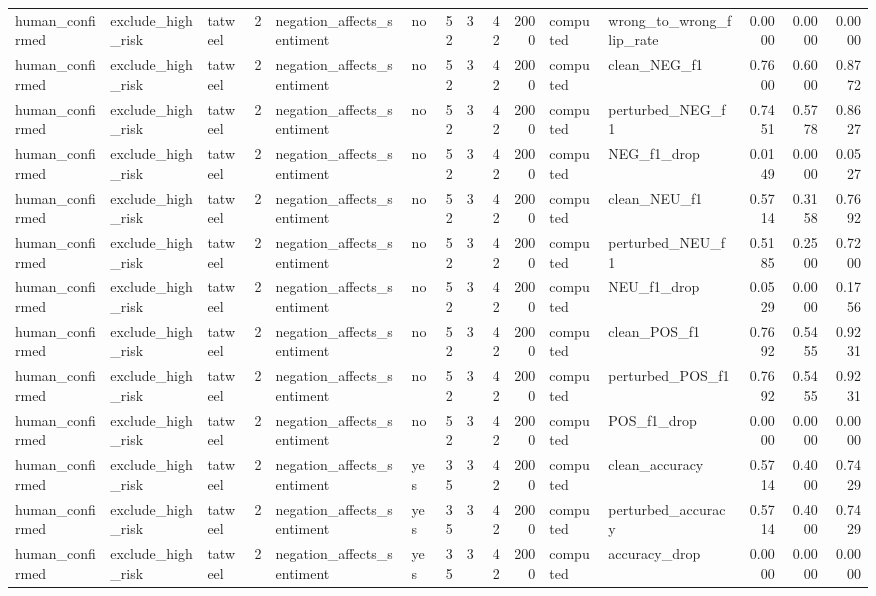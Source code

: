 \begin{tabular}{lllrllrrrrllrrr}
human_confirmed & exclude_high_risk & tatweel & 2 & negation_affects_sentiment & no & 52 & 3 & 42 & 2000 & computed & wrong_to_wrong_flip_rate & 0.0000 & 0.0000 & 0.0000 \\
human_confirmed & exclude_high_risk & tatweel & 2 & negation_affects_sentiment & no & 52 & 3 & 42 & 2000 & computed & clean_NEG_f1 & 0.7600 & 0.6000 & 0.8772 \\
human_confirmed & exclude_high_risk & tatweel & 2 & negation_affects_sentiment & no & 52 & 3 & 42 & 2000 & computed & perturbed_NEG_f1 & 0.7451 & 0.5778 & 0.8627 \\
human_confirmed & exclude_high_risk & tatweel & 2 & negation_affects_sentiment & no & 52 & 3 & 42 & 2000 & computed & NEG_f1_drop & 0.0149 & 0.0000 & 0.0527 \\
human_confirmed & exclude_high_risk & tatweel & 2 & negation_affects_sentiment & no & 52 & 3 & 42 & 2000 & computed & clean_NEU_f1 & 0.5714 & 0.3158 & 0.7692 \\
human_confirmed & exclude_high_risk & tatweel & 2 & negation_affects_sentiment & no & 52 & 3 & 42 & 2000 & computed & perturbed_NEU_f1 & 0.5185 & 0.2500 & 0.7200 \\
human_confirmed & exclude_high_risk & tatweel & 2 & negation_affects_sentiment & no & 52 & 3 & 42 & 2000 & computed & NEU_f1_drop & 0.0529 & 0.0000 & 0.1756 \\
human_confirmed & exclude_high_risk & tatweel & 2 & negation_affects_sentiment & no & 52 & 3 & 42 & 2000 & computed & clean_POS_f1 & 0.7692 & 0.5455 & 0.9231 \\
human_confirmed & exclude_high_risk & tatweel & 2 & negation_affects_sentiment & no & 52 & 3 & 42 & 2000 & computed & perturbed_POS_f1 & 0.7692 & 0.5455 & 0.9231 \\
human_confirmed & exclude_high_risk & tatweel & 2 & negation_affects_sentiment & no & 52 & 3 & 42 & 2000 & computed & POS_f1_drop & 0.0000 & 0.0000 & 0.0000 \\
human_confirmed & exclude_high_risk & tatweel & 2 & negation_affects_sentiment & yes & 35 & 3 & 42 & 2000 & computed & clean_accuracy & 0.5714 & 0.4000 & 0.7429 \\
human_confirmed & exclude_high_risk & tatweel & 2 & negation_affects_sentiment & yes & 35 & 3 & 42 & 2000 & computed & perturbed_accuracy & 0.5714 & 0.4000 & 0.7429 \\
human_confirmed & exclude_high_risk & tatweel & 2 & negation_affects_sentiment & yes & 35 & 3 & 42 & 2000 & computed & accuracy_drop & 0.0000 & 0.0000 & 0.0000 \\

\end{tabular}
